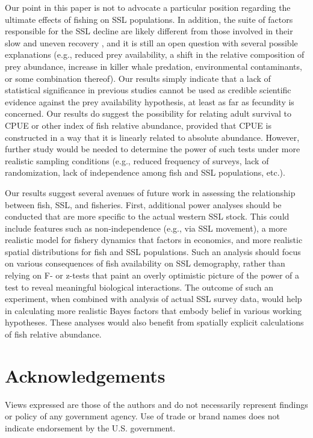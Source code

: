 \documentclass[nonumbib,leqno]{nrc1}
\begin{document}
Our point in this paper is not to advocate a particular position regarding the ultimate effects of fishing on SSL populations.  In addition, the suite of factors responsible for the SSL decline are likely different from those involved in their slow and uneven recovery \citep{AtkinsonEtAl2008}, and it is still an open question with several possible explanations (e.g., reduced prey availability, a shift in the relative composition of prey abundance, increase in killer whale predation, environmental contaminants, or some combination thereof).  Our results simply indicate that a lack of statistical significance in previous studies cannot be used as credible scientific evidence against the prey availability hypothesis, at least as far as fecundity is concerned.  Our results do suggest the possibility for relating adult survival to CPUE or other index of fish relative abundance, provided that CPUE is constructed in a way that it is linearly related to absolute abundance.  However, further study would be needed to determine the power of such tests under more realistic sampling conditions (e.g., reduced frequency of surveys, lack of randomization, lack of independence among fish and SSL populations, etc.).

Our results suggest several avenues of future work in assessing the relationship between fish, SSL, and fisheries.  First, additional power analyses should be conducted that are more specific to the actual western SSL stock.  This could include features such as non-independence (e.g., via SSL movement), a more realistic model for fishery dynamics that factors in economics, and more realistic spatial distributions for fish and SSL populations.  Such an analysis should focus on various consequences of fish availability on SSL demography, rather than relying on F- or z-tests \citep[e.g.,][]{Calkins:2008ve,Hui:2011uq,Soboleff:2006fk} that paint an overly optimistic picture of the power of a test to reveal meaningful biological interactions.  The outcome of such an experiment, when combined with analysis of actual SSL survey data, would help in calculating more realistic Bayes factors that embody belief in various working hypotheses. These analyses would also benefit from spatially explicit calculations of fish relative abundance.



\section{Acknowledgements}
Views expressed are those of the authors and do not necessarily represent findings or policy of any government agency.  Use of trade or brand names does not indicate endorsement by the U.S. government.
\end{document}
